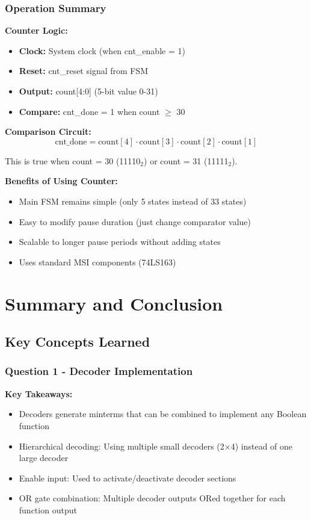 \documentclass[12pt,a4paper]{article}
\begin{document}
\subsubsection{Operation Summary}

\textbf{Counter Logic:}
\begin{itemize}
  \item \textbf{Clock:} System clock (when cnt\_enable = 1)
  \item \textbf{Reset:} cnt\_reset signal from FSM
  \item \textbf{Output:} count[4:0] (5-bit value 0-31)
  \item \textbf{Compare:} cnt\_done = 1 when count $\geq$ 30
\end{itemize}

\textbf{Comparison Circuit:}
\[
\text{cnt\_done} = \text{count}[4] \cdot \text{count}[3] \cdot \text{count}[2] \cdot \text{count}[1]
\]

This is true when count = 30 (11110$_2$) or count = 31 (11111$_2$).

\textbf{Benefits of Using Counter:}
\begin{itemize}
  \item Main FSM remains simple (only 5 states instead of 33 states)
  \item Easy to modify pause duration (just change comparator value)
  \item Scalable to longer pause periods without adding states
  \item Uses standard MSI components (74LS163)
\end{itemize}

\newpage
\section{Summary and Conclusion}

\subsection{Key Concepts Learned}

\subsubsection{Question 1 - Decoder Implementation}
\begin{tcolorbox}[colback=green!5!white,colframe=green!75!black]
\textbf{Key Takeaways:}
\begin{itemize}
  \item Decoders generate minterms that can be combined to implement any Boolean function
  \item Hierarchical decoding: Using multiple small decoders (2×4) instead of one large decoder
  \item Enable input: Used to activate/deactivate decoder sections
  \item OR gate combination: Multiple decoder outputs ORed together for each function output
\end{itemize}
\end{tcolorbox}
\end{document}
